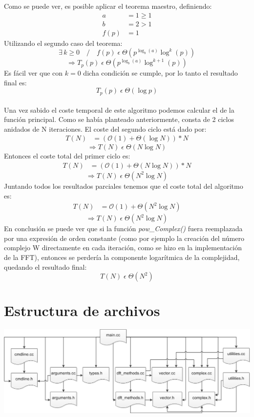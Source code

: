 \documentclass{article}
\begin{document}
    Como se puede ver, es posible aplicar el teorema maestro, definiendo:
    \begin{align*}
      a &= 1 \geq 1 \\
      b &= 2 > 1\\
   f(p) &= 1 
    \end{align*}
      Utilizando el segundo caso del teorema:
    $$ \exists\,k \geq 0 \quad / \quad f(p) \;\epsilon\; \Theta (p^{\log_b (a)} \log^k (p)) $$
    $$ \Rightarrow T_p(p)\;\epsilon\;\Theta (p^{\log_b (a)} \log^{k+1} (p)) $$
      Es fácil ver que con $k=0$ dicha condición se cumple, por lo tanto
    el resultado final es:
    $$ T_p(p)\;\epsilon\;\Theta (\log p) $$\\
  Una vez sabido el coste temporal de este algoritmo podemos calcular el de la función
  principal. Como se había planteado anteriormente, consta de 2 ciclos anidados de N iteraciones.
  El coste del segundo ciclo está dado por:
  \begin{align*}
      T(N) &= (\mathcal{O}(1) + {\Theta}(\log N)) * N
  \end{align*}
    $$ \Rightarrow T(N)\;\epsilon\;\Theta (N\log N) $$
  Entonces el coste total del primer ciclo es:
  \begin{align*}
      T(N) &= (\mathcal{O}(1) + {\Theta}(N\log N)) * N
  \end{align*}
  $$ \Rightarrow T(N)\;\epsilon\;\Theta (N^2\log N) $$
  Juntando todos los resultados parciales tenemos que el coste total del algoritmo es:
  \begin{align*}
      T(N) &= \mathcal{O}(1) + {\Theta}(N^2\log N)
  \end{align*}
  $$ \Rightarrow \boxed{ T(N)\;\epsilon\;\Theta (N^2\log N) } $$
    En conclusión se puede ver que si la función \textit{pow\_Complex()} fuera reemplazada por
  una expresión de orden constante (como por ejemplo la creación del número complejo W
  directamente en cada iteración, como se hizo en la implementación de la FFT), entonces se 
  perdería la componente logarítmica de la complejidad, quedando el resultado final:
  $$ \boxed{ T(N)\;\epsilon\;\Theta (N^2) } $$



\section{Estructura de archivos}

\begin{center}
  \includegraphics[width=0.8\paperwidth]{Imagenes/jerarquia_de_archivos}
\par
\end{center}
\end{document}
